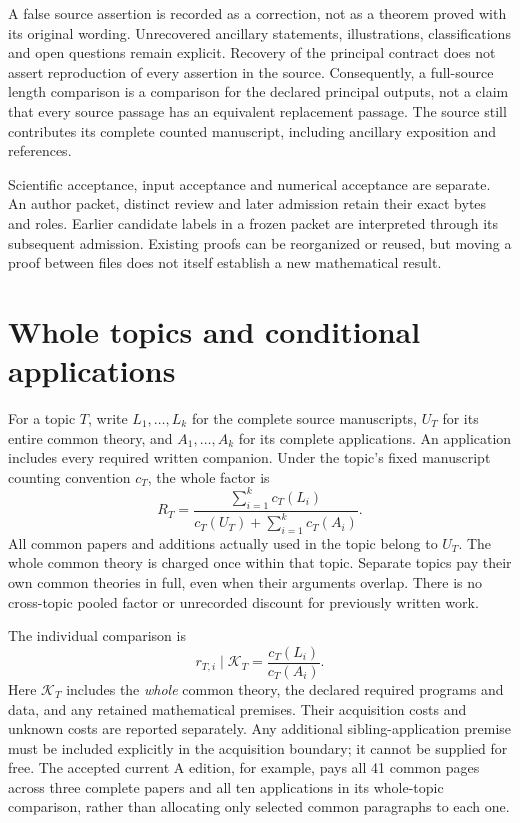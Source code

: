 \documentclass[11pt,a4paper]{article}
\begin{document}
A false source assertion is recorded as a correction, not as a theorem proved
with its original wording. Unrecovered ancillary statements, illustrations,
classifications and open questions remain explicit. Recovery of the principal
contract does not assert reproduction of every assertion in the source.
Consequently, a full-source length comparison is a comparison for the declared
principal outputs, not a claim that every source passage has an equivalent
replacement passage. The source still contributes its complete counted
manuscript, including ancillary exposition and references.

Scientific acceptance, input acceptance and numerical acceptance are separate.
An author packet, distinct review and later admission retain their exact bytes
and roles. Earlier candidate labels in a frozen packet are interpreted through
its subsequent admission. Existing proofs can be reorganized or reused, but
moving a proof between files does not itself establish a new mathematical result.

\section{Whole topics and conditional applications}

For a topic $T$, write $L_1,\ldots,L_k$ for the complete source manuscripts,
$U_T$ for its entire common theory, and $A_1,\ldots,A_k$ for its complete
applications. An application includes every required written companion.
Under the topic's fixed manuscript counting convention $c_T$, the whole factor is
\[
 R_T=\frac{\sum_{i=1}^k c_T(L_i)}
 {c_T(U_T)+\sum_{i=1}^k c_T(A_i)}.
\]
All common papers and additions actually used in the topic belong to $U_T$.
The whole common theory is charged once within that topic. Separate topics pay
their own common theories in full, even when their arguments overlap. There is
no cross-topic pooled factor or unrecorded discount for previously written work.

The individual comparison is
\[
 r_{T,i}\mid\mathcal K_T=\frac{c_T(L_i)}{c_T(A_i)}.
\]
Here $\mathcal K_T$ includes the \emph{whole} common theory, the declared
required programs and data, and any retained mathematical premises. Their
acquisition costs and unknown costs are reported separately. Any additional
sibling-application premise must be included explicitly in the acquisition
boundary; it cannot be supplied for free. The accepted current A edition, for
example, pays all 41 common pages across three complete papers and all ten applications in its whole-topic
comparison, rather than allocating only selected common paragraphs to each one.
\end{document}
